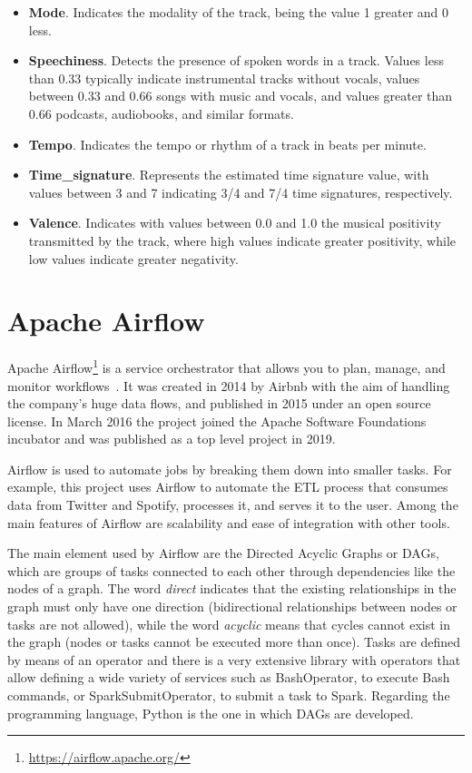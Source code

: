 \begin{itemize}
\begin{itemize}
		\item \textbf{Mode}. Indicates the modality of the track, being the value 1 greater and 0 less.
		\item \textbf{Speechiness}. Detects the presence of spoken words in a track. Values less than 0.33 typically indicate instrumental tracks without vocals, values between 0.33 and 0.66 songs with music and vocals, and values greater than 0.66 podcasts, audiobooks, and similar formats.
		\item \textbf{Tempo}. Indicates the tempo or rhythm of a track in beats per minute.
		\item \textbf{Time\_signature}. Represents the estimated time signature value, with values between 3 and 7 indicating 3/4 and 7/4 time signatures, respectively.
		\item \textbf{Valence}. Indicates with values between 0.0 and 1.0 the musical positivity transmitted by the track, where high values indicate greater positivity, while low values indicate greater negativity.
	\end{itemize}
\end{itemize}

\section{Apache Airflow}

\nonzeroparskip Apache Airflow\footnote{\url{https://airflow.apache.org/}} is a service orchestrator that allows you to plan, manage, and monitor workflows~\cite{airflow}. It was created in 2014 by Airbnb with the aim of handling the company's huge data flows, and published in 2015 under an open source license. In March 2016 the project joined the Apache Software Foundations incubator and was published as a top level project in 2019.

\nonzeroparskip Airflow is used to automate jobs by breaking them down into smaller tasks. For example, this project uses Airflow to automate the ETL process that consumes data from Twitter and Spotify, processes it, and serves it to the user. Among the main features of Airflow are scalability and ease of integration with other tools.

\nonzeroparskip The main element used by Airflow are the Directed Acyclic Graphs or DAGs, which are groups of tasks connected to each other through dependencies like the nodes of a graph. The word \textit{direct} indicates that the existing relationships in the graph must only have one direction (bidirectional relationships between nodes or tasks are not allowed), while the word \textit{acyclic} means that cycles cannot exist in the graph (nodes or tasks cannot be executed more than once). Tasks are defined by means of an operator and there is a very extensive library with operators that allow defining a wide variety of services such as BashOperator, to execute Bash commands, or SparkSubmitOperator, to submit a task to Spark. Regarding the programming language, Python is the one in which DAGs are developed.

